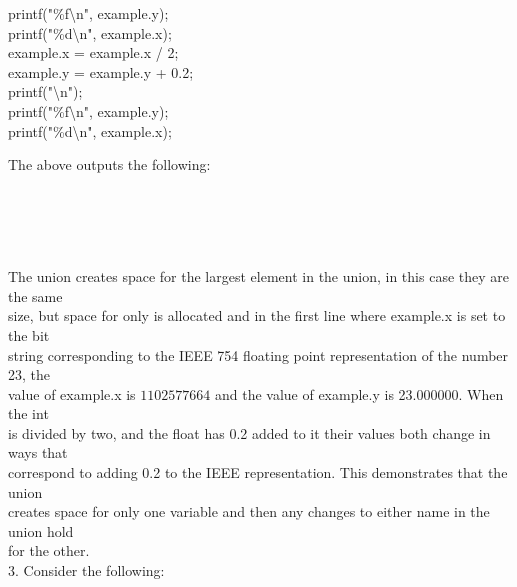 \documentclass[12pt]{article}
\begin{document}
\begin{flushleft}
{\qquad \qquad printf("\%f\textbackslash n", example.y);\\
\qquad \qquad printf("\%d\textbackslash n", example.x);\\
[2mm]   

\qquad \qquad example.x = example.x / 2;\\
\qquad \qquad example.y = example.y + 0.2;\\
[2mm]   
\qquad \qquad printf("\textbackslash n");\\
\qquad \qquad printf("\%f\textbackslash n", example.y);\\
\qquad \qquad printf("\%d\textbackslash n", example.x);\\[2mm]
}

\qquad \qquad The above outputs the following:\\
[2mm]

{\selectfont
\qquad \qquad {}\\
\qquad \qquad {}\\
[2mm]

\qquad \qquad {}\\
\qquad \qquad {}\\
[2mm]
}

\qquad \qquad The union creates space for the largest element in the union, in this case they are the same\\
\qquad \qquad size, but space for only is allocated and in the first line where {\selectfont example.x} is set to the bit\\
\qquad \qquad string corresponding to the IEEE 754 floating point representation of the number 23, the\\
\qquad \qquad value of {\selectfont example.x} is $1102577664$ and the value of {\selectfont example.y} is 23.000000.  When the int\\
\qquad \qquad is divided by two, and the float has 0.2 added to it their values both change in ways that\\
\qquad \qquad correspond to adding 0.2 to the IEEE representation.  This demonstrates that the union\\
\qquad \qquad creates space for only one variable and then any changes to either name in the union hold\\
\qquad \qquad for the other.\\
[30mm] 




3. Consider the following:\\


\end{flushleft}
\end{document}
